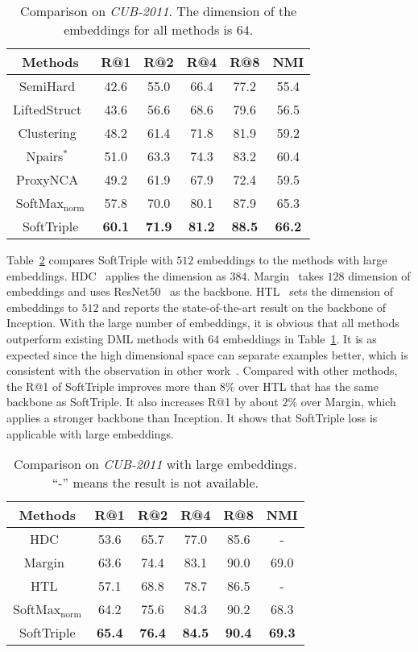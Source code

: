 \documentclass[10pt,twocolumn,letterpaper]{article}
\begin{document}
\begin{table}[!ht]
\centering
\small
\caption{Comparison on \textit{CUB-2011}. The dimension of the embeddings for all methods is $64$.}\label{ta:birds64}
\begin{tabular}{c|ccccc}
Methods&R@1&R@2&R@4&R@8&NMI\\\hline
SemiHard~\cite{SchroffKP15}&42.6&55.0&66.4&77.2&55.4\\
LiftedStruct~\cite{SongXJS16}&43.6&56.6&68.6&79.6&56.5\\
Clustering~\cite{SongJR017}&48.2&61.4&71.8&81.9&59.2\\
Npairs$^*$~\cite{Sohn16}&51.0&63.3&74.3&83.2&60.4\\
ProxyNCA~\cite{Attias17}&49.2&61.9&67.9&72.4&59.5\\\hline
SoftMax$_{\mathrm{norm}}$&57.8&70.0&80.1&87.9&65.3\\
SoftTriple&\textbf{60.1}&\textbf{71.9}&\textbf{81.2}&\textbf{88.5}&\textbf{66.2}\\
\end{tabular}
\end{table}

Table~\ref{ta:birds512} compares SoftTriple with $512$ embeddings to the methods with large embeddings. HDC~\cite{YuanYZ17} applies the dimension as $384$. Margin~\cite{ManmathaWSK17} takes $128$ dimension of embeddings and uses ResNet50~\cite{HeZRS16} as the backbone. HTL~\cite{GeHDS18} sets the dimension of embeddings to $512$ and reports the state-of-the-art result on the backbone of Inception. With the large number of embeddings, it is obvious that all methods outperform existing DML methods with $64$ embeddings in Table~\ref{ta:birds64}. It is as expected since the high dimensional space can separate examples better, which is consistent with the observation in other work~\cite{SongXJS16}. Compared with other methods, the R@1 of SoftTriple improves more than $8\%$ over HTL that has the same backbone as SoftTriple. It also increases R@1 by about $2\%$ over Margin, which applies a stronger backbone than Inception. It shows that SoftTriple loss is applicable with large embeddings.

\begin{table}[!ht]
\centering
\small
\caption{Comparison on \textit{CUB-2011} with large embeddings. ``-'' means the result is not available.}\label{ta:birds512}
\begin{tabular}{c|ccccc}
Methods&R@1&R@2&R@4&R@8&NMI\\\hline
HDC~\cite{YuanYZ17}&53.6&65.7&77.0&85.6&-\\
Margin~\cite{ManmathaWSK17}&63.6&74.4&83.1&90.0&69.0\\
HTL~\cite{GeHDS18}&57.1&68.8&78.7&86.5&-\\\hline
SoftMax$_{\mathrm{norm}}$&64.2&75.6&84.3&90.2&68.3\\
SoftTriple&\textbf{65.4}&\textbf{76.4}&\textbf{84.5}&\textbf{90.4}&\textbf{69.3}\\
\end{tabular}
\end{table}
\end{document}
